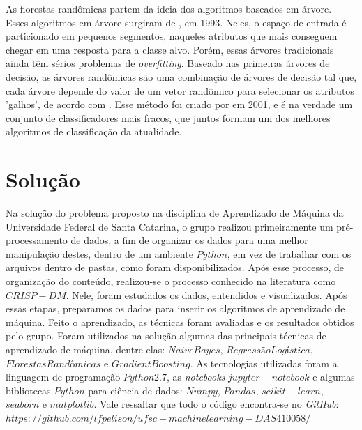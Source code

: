 \documentclass [12pt, a4paper] {article}
\begin{document}
As florestas randômicas partem da ideia dos algoritmos baseados em árvore. Esses algoritmos em árvore surgiram de \cite{quinlan}, em 1993. Neles, o espaço de entrada é particionado em pequenos segmentos, naqueles atributos que mais conseguem chegar em uma resposta para a classe alvo. Porém, essas árvores tradicionais ainda têm sérios problemas de \textit{overfitting}. Baseado nas primeiras árvores de decisão, as árvores randômicas são uma combinação de árvores de decisão tal que, cada árvore depende do valor de um vetor randômico para selecionar os atributos 'galhos', de acordo com \cite{random}. Esse método foi criado por \cite{forest} em 2001, e é na verdade um conjunto de classificadores mais fracos, que juntos formam um dos melhores algoritmos de classificação da atualidade.


\section{Solução}

Na solução do problema proposto na disciplina de Aprendizado de Máquina da Universidade Federal de Santa Catarina, o grupo realizou primeiramente um pré-processamento de dados, a fim de organizar os dados para uma melhor manipulação destes, dentro de um ambiente $Python$, em vez de trabalhar com os arquivos dentro de pastas, como foram disponibilizados. Após esse processo, de organização do conteúdo, realizou-se o processo conhecido na literatura como $CRISP-DM$. Nele, foram estudados os dados, entendidos e visualizados. Após essas etapas, preparamos os dados para inserir os algoritmos de aprendizado de máquina. Feito o aprendizado, as técnicas foram avaliadas e os resultados obtidos pelo grupo. Foram utilizados na solução algumas das principais técnicas de aprendizado de máquina, dentre elas: $Naive Bayes$, $Regressão Logística$, $Florestas Randômicas$ e $Gradient Boosting$. As tecnologias utilizadas foram a linguagem de programação $Python 2.7$, as \textit{notebooks} $jupyter-notebook$ e algumas bibliotecas $Python$ para ciência de dados: $Numpy$, $Pandas$, $scikit-learn$, $seaborn$ e $matplotlib$. Vale ressaltar que todo o código encontra-se no \textit{GitHub}: $https://github.com/lfpelison/ufsc-machinelearning-DAS410058/$
\end{document}
